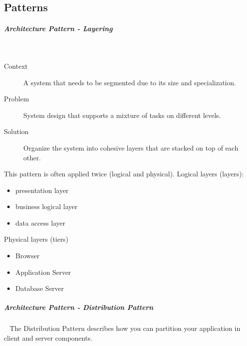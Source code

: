 \documentclass[11pt,twoside,landscape]{article}
\begin{document}
\begin{multicols}{3}
\section{Patterns}
\label{sec:orgbb86a8b}
\subparagraph{Architecture Pattern - Layering} \
\label{sec:orgd658a63}
\begin{description}
\item[{Context}] A system that needs to be segmented due to its size and specialization.
\item[{Problem}] System design that supports a mixture of tasks on different levels.
\item[{Solution}] Organize the system into cohesive layers that are stacked on top of each other.
\end{description}


This pattern is often applied twice (logical and physical).
Logical layers (layers):
\begin{itemize}
\item presentation layer
\item business logical layer
\item data access layer
\end{itemize}

Physical layers (tiers)
\begin{itemize}
\item Browser
\item Application Server
\item Database Server
\end{itemize}
\subparagraph{Architecture Pattern - Distribution Pattern} \
\label{sec:org1f938ba}
The Distribution Pattern describes how you can partition your application in client and server components.


\end{multicols}
\end{document}

